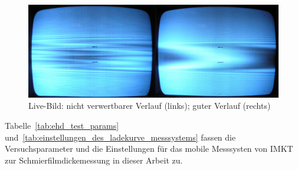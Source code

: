 \begin{figure}[htb]
    \centering
    \includegraphics[width=0.8\linewidth]{./images/ehd_live_bild.jpg}
    \caption{Live-Bild: nicht verwertbarer Verlauf (links); guter Verlauf (rechts)~\cite{mach_2008}}
    \label{fig:ehd_live_bild}
\end{figure}

Tabelle~\ref{tab:ehd_test_params} und~\ref{tab:einstellungen_des_ladekurve_messsystems} fassen die Versuchsparameter und die Einstellungen für das mobile Messsysten von IMKT zur Schmierfilmdickemessung in dieser Arbeit zu.





